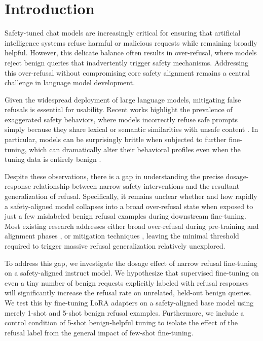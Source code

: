 \section{Introduction}
\label{sec:intro}

Safety-tuned chat models are increasingly critical for ensuring that artificial intelligence systems refuse harmful or malicious requests while remaining broadly helpful. However, this delicate balance often results in over-refusal, where models reject benign queries that inadvertently trigger safety mechanisms. Addressing this over-refusal without compromising core safety alignment remains a central challenge in language model development.

Given the widespread deployment of large language models, mitigating false refusals is essential for usability. Recent works highlight the prevalence of exaggerated safety behaviors, where models incorrectly refuse safe prompts simply because they share lexical or semantic similarities with unsafe content \cite{rottger2023xstest, cui2024orbench, an2024phtest}. In particular, models can be surprisingly brittle when subjected to further fine-tuning, which can dramatically alter their behavioral profiles even when the tuning data is entirely benign \cite{qi2023finetuning, betley2025emergent}.

Despite these observations, there is a gap in understanding the precise dosage-response relationship between narrow safety interventions and the resultant generalization of refusal. Specifically, it remains unclear whether and how rapidly a safety-aligned model collapses into a broad over-refusal state when exposed to just a few mislabeled benign refusal examples during downstream fine-tuning. Most existing research addresses either broad over-refusal during pre-training and alignment phases \cite{xue2026deactivating}, or mitigation techniques \cite{wang2024surgical, si2025think}, leaving the minimal threshold required to trigger massive refusal generalization relatively unexplored.

To address this gap, we investigate the dosage effect of narrow refusal fine-tuning on a safety-aligned instruct model. We hypothesize that supervised fine-tuning on even a tiny number of benign requests explicitly labeled with refusal responses will significantly increase the refusal rate on unrelated, held-out benign queries. We test this by fine-tuning LoRA adapters on a safety-aligned base model using merely 1-shot and 5-shot benign refusal examples. Furthermore, we include a control condition of 5-shot benign-helpful tuning to isolate the effect of the refusal label from the general impact of few-shot fine-tuning.

